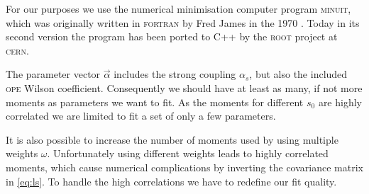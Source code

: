 \documentclass[../../index.tex]{subfiles}
\begin{document}
For our purposes we use the numerical minimisation computer program
\textsc{minuit}, which was originally written in \textsc{fortran} by Fred James
in the 1970 \cite{James1975}. Today in its second version the program has been ported to C++ by
the \textsc{root} \cite{Brun1997} project at \textsc{cern}.

The parameter vector \(\vec\alpha\) includes the strong coupling \(\alpha_s\),
but also the included \textsc{ope} Wilson coefficient. Consequently we should
have at least as many, if not more moments as parameters we want to fit. As the
moments for different \(s_0\) are highly correlated we are limited to fit a set
of only a few parameters.

It is also possible to increase the number of moments used by using multiple
weights \(\omega\). Unfortunately using different weights leads to highly
correlated moments, which cause numerical complications by inverting the
covariance matrix in \cref{eq:ls}. To handle the high correlations we have to
redefine our fit quality.
\end{document}
